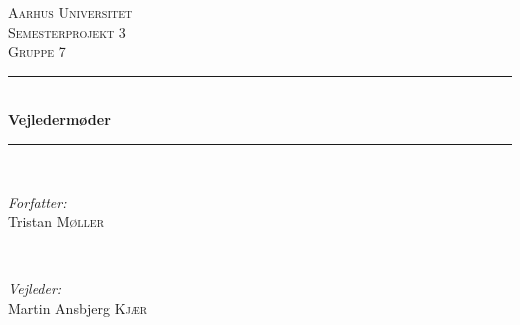 \documentclass[12pt]{article}
\begin{document}
\begin{titlepage}

\newcommand{\HRule}{\rule{\linewidth}{0.5mm}} %

\center %
 

\textsc{\LARGE Aarhus Universitet}\\[1.5cm] %
\textsc{\Large Semesterprojekt 3}\\[0.5cm] %
\textsc{\large Gruppe 7}\\[0.5cm] %


\HRule \\[0.4cm]
{ \huge \bfseries Vejledermøder}\\[0.4cm] %
\HRule \\[1.5cm]
 

\begin{minipage}{0.4\textwidth}
\begin{flushleft} \large
\emph{Forfatter:}\\
Tristan \textsc{Møller} %
\end{flushleft}
\end{minipage}
~
\begin{minipage}{0.4\textwidth}
\begin{flushright} \large
\emph{Vejleder:} \\
Martin Ansbjerg \textsc{Kjær} %
\end{flushright}
\end{minipage}\\[2cm]



\end{titlepage}
\end{document}
